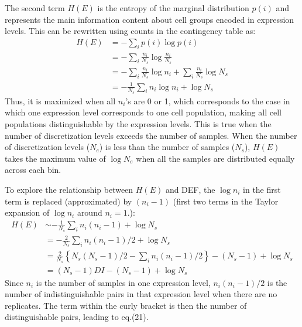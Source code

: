 The second term $H(E)$ is the entropy of the marginal distribution $p(i)$ and represents the main information content about cell groups encoded in expression levels. This can be rewritten using counts in the contingency table as:
\begin{align}
H(E) &= -\sum_{i}p(i)\log p(i) \\
     &= -\sum_{i}\frac{n_i}{N_s} \log \frac{n_i}{N_s} \\
     &= -\sum_{i}\frac{n_i}{N_s} \log n_i + \sum_{i}\frac{n_i}{N_s}\log N_s \\
     &= - \frac{1}{N_s}\sum_{i}n_i\log n_i + \log N_s
\end{align}
Thus, it is maximized when all $n_i$'s are 0 or 1, which corresponds to the case in which one expression level corresponds to one cell population, making all cell populations distinguishable by the expression levels. This is true when the number of discretization levels exceeds the number of samples. When the number of discretization levels ($N_e$) is less than the number of samples ($N_s$), $H(E)$ takes the maximum value of $\log N_e$ when all the samples are distributed equally across each bin.

To explore the relationship between $H(E)$ and DEF, the $\log n_i$ in the first term is replaced (approximated) by $(n_i-1)$ (first two terms in the Taylor expansion of $\log n_i$ around $n_i=1$.):
\begin{align}
H(E) &\sim -\frac{1}{N_s}\sum_{i}n_i (n_i-1) + \log N_s \\
	 &= -\frac{2}{N_s}\sum_{i}n_i (n_i-1)/2 + \log N_s \\
     &=  \frac{2}{N_s}\left\{N_s(N_s-1)/2 - \sum_{i}n_i (n_i-1)/2\right\} - (N_s-1) + \log N_s \\
     &= (N_s-1) DI - (N_s-1) + \log N_s 
\end{align}
Since $n_i$ is the number of samples in one expression level, $n_i(n_i-1)/2$ is the number of indistinguishable pairs in that expression level when there are no replicates. The term within the curly bracket is then the number of distinguishable pairs, leading to eq.(21). 

